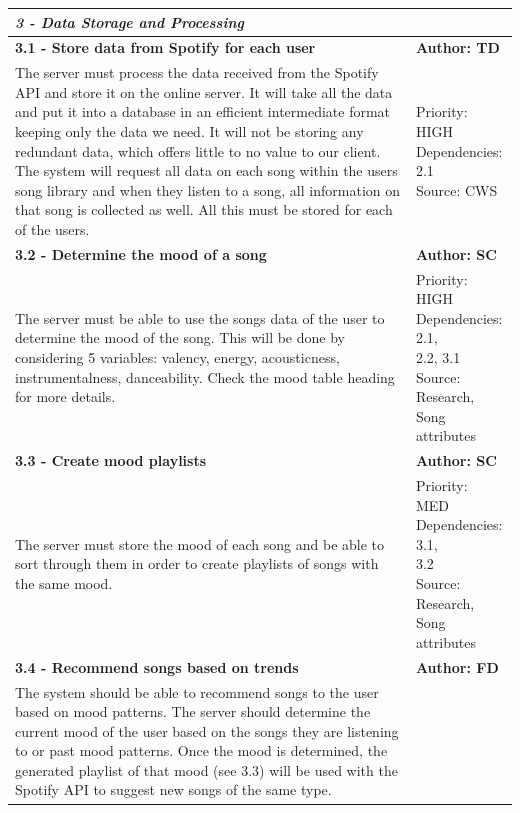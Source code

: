 \documentclass[10pt, notitlepage]{report}
\begin{document}
\begin{center}
\begin{longtable}{| p{13cm} | p{3cm} |}
\multicolumn{2}{|l|}{\textbf{\textit{3 - Data Storage and Processing}}} \\
\hline
\textbf{3.1 - Store data from Spotify for each user} & \textbf{Author: TD} \\
\hline
The server must process the data received from the Spotify API and store it on the online server. It will take all the data and put it into a database in an efficient intermediate format keeping only the data we need. It will not be storing any redundant data, which offers little to no value to our client. The system will request all data on each song within the users song library and when they listen to a song, all information on that song is collected as well. All this must be stored for each of the users. &
\makecell{Priority: HIGH\\Dependencies: 2.1\\Source: CWS} \\
\hline
\textbf{3.2 - Determine the mood of a song} & \textbf{Author: SC} \\
\hline
The server must be able to use the songs data of the user to determine the mood of the song. This will be done by considering 5 variables: valency, energy, acousticness, instrumentalness, danceability. Check the mood table heading for more details. & 
\makecell{Priority: HIGH\\Dependencies: 2.1,\\2.2, 3.1\\Source: Research,\\ Song attributes}\\
\hline
\textbf{3.3 - Create mood playlists} & \textbf{Author: SC} \\
\hline
The server must store the mood of each song and be able to sort through them in order to create playlists of songs with the same mood. & 
\makecell{Priority: MED\\Dependencies: 3.1,\\3.2\\Source: Research,\\ Song attributes}\\
\hline
\textbf{3.4 - Recommend songs based on trends} & \textbf{Author: FD} \\
\hline
The system should be able to recommend songs to the user based on mood patterns. The server should determine the current mood of the user based on the songs they are listening to or past mood patterns. Once the mood is determined, the generated playlist of that mood (see 3.3) will be used with the Spotify API to suggest new songs of the same type. &  

\end{longtable}
\end{center}
\end{document}
